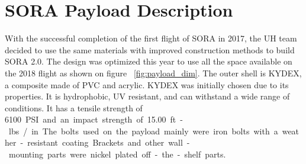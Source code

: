 \section{SORA Payload Description}
\label{sec:Hardware}
With the successful completion of the first flight of SORA in 2017, the UH team decided to use the same materials with improved construction methods to build SORA 2.0.  The design was optimized this year to use all the space available on the 2018 flight as shown on figure ~\ref{fig:payload_dim}.   The outer shell is KYDEX, a composite made of PVC and acrylic. KYDEX	 was initially chosen due to its properties.  It is hydrophobic, UV resistant, and can withstand a wide range of conditions.  It has a tensile strength of \SI{6100} PSI and an impact strength of \SI{15.00} ft.-lbs./in.  The bolts used on the payload mainly were iron bolts with a weather-resistant coating.   Brackets and other wall-mounting parts were nickel plated off-the-shelf parts.  
%
